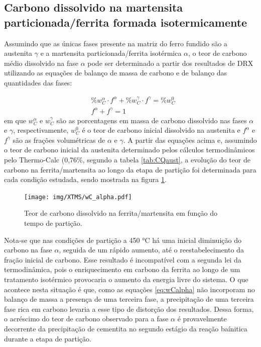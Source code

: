 \subsection{Carbono dissolvido na martensita particionada/ferrita formada isotermicamente}

\label{subsec:wCalpha}

Assumindo que as únicas fases presente na matriz do ferro fundido são a austenita $\gamma$ e a martensita particionada/ferrita isotérmica $\alpha$, o teor de carbono médio dissolvido na fase $\alpha$ pode ser determinado a partir dos resultados de DRX utilizando as equações de balanço de massa de carbono e de balanço das quantidades das fases:

\begin{subequations}
	\begin{align}
		&\%w_C^\alpha \cdot f^\alpha + \%w_C^\gamma \cdot f^\gamma = \%w_C^0\\
		&f^\alpha + f^\gamma = 1 
	\end{align}
	\label{eq:wCalpha}
\end{subequations}
%
em que $w_C^\alpha$ e $w_C^\gamma$ são as porcentagens em massa de carbono dissolvido nas fases $\alpha$ e $\gamma$, respectivamente, $w_C^0$ é o teor de carbono inicial dissolvido na austenita e $f^\alpha$ e $f^\gamma$ são as frações volumétricas de $\alpha$ e $\gamma$. A partir das equações acima e, assumindo o teor de carbono inicial da austenita determinado pelos cálculos termodinâmicos pelo Thermo-Calc\textregistered{} (0,76\%, segundo a tabela \ref{tab:CQaust}, a evolução do teor de carbono na ferrita/martensita ao longo da etapa de partição foi determinada para cada condição estudada, sendo mostrada na figura \ref{fig:wCalpha}.

\begin{figure}
	\texttt{[image: img/XTMS/wC\_alpha.pdf]}
	\caption{Teor de carbono dissolvido na ferrita/martensita em função do tempo de partição.}
	\label{fig:wCalpha}
\end{figure}

Nota-se que nas condições de partição a 450 °C há uma inicial diminuição do carbono na fase $\alpha$, seguida de um rápido aumento, até o reestabelecimento da fração inicial de carbono. Esse resultado é incompatível com a segunda lei da termodinâmica, pois o enriquecimento em carbono da ferrita ao longo de um tratamento isotérmico provocaria o aumento da energia livre do sistema. O que acontece nesta situação é que, como as equações \ref{eq:wCalpha} não incorporam no balanço de massa a presença de uma terceira fase, a precipitação de uma terceira fase rica em carbono levaria a esse tipo de distorção dos resultados. Dessa forma, o acréscimo do teor de carbono observado para a fase $\alpha$ é provavelmente decorrente da precipitação de cementita no segundo estágio da reação baínitica durante a etapa de partição.

